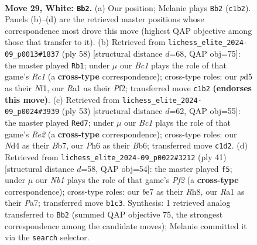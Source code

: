 \documentclass[11pt]{article}
\begin{document}
\clearpage

\begin{figure}[p]\centering
\begin{subfigure}{0.46\textwidth}\centering
\resizebox{\linewidth}{!}{%
\newchessgame
\chessboard[
  setfen={rn1k1r2/1p2bb1p/6pP/p2pPp2/P2N4/6P1/6K1/RNB2R2 w - - 1 29},
  showmover=false,
  pgfstyle=straightmove, color=movearrow, markmove={c1-b2}
]}
\caption{}
\end{subfigure}\hfill
\begin{subfigure}{0.46\textwidth}\centering
\resizebox{\linewidth}{!}{%
\newchessgame
\chessboard[
  setfen={2r1r1k1/1p4b1/p5pp/P3pp2/1nP5/7P/5PPB/2R1RNK1 w - - 0 30},
  showmover=false,
  pgfstyle=straightmove, color=movearrow, markmove={c1-b1}
]}
\caption{}
\end{subfigure}
\\[4pt]
\begin{subfigure}{0.46\textwidth}\centering
\resizebox{\linewidth}{!}{%
\newchessgame
\chessboard[
  setfen={3r2k1/1b2rp2/1b5p/2pP2p1/2B5/6BP/1P3PP1/R2R1K2 b - - 1 27},
  showmover=false,
  pgfstyle=straightmove, color=movearrow, markmove={e7-d7}
]}
\caption{}
\end{subfigure}\hfill
\begin{subfigure}{0.46\textwidth}\centering
\resizebox{\linewidth}{!}{%
\newchessgame
\chessboard[
  setfen={2k3rr/ppp2p2/2nb4/3p4/3P2P1/2P1N3/PP6/R1B1R1K1 b - - 0 21},
  showmover=false,
  pgfstyle=straightmove, color=movearrow, markmove={f7-f5}
]}
\caption{}
\end{subfigure}
\caption{\textbf{Move 29, White: \texttt{Bb2}.} (a) Our position; Melanie plays \texttt{Bb2} (\texttt{c1b2}). Panels (b)--(d) are the retrieved master positions whose correspondence most drove this move (highest QAP objective among those that transfer to it). (b) Retrieved from \texttt{lichess\_elite\_2024-09\_p0013\#1837} (ply 58) [structural distance $d$=68, QAP obj=75]: the master played \texttt{Rb1}; under $\mu$ our \emph{Bc1} plays the role of that game's \emph{Rc1} (a \textbf{cross-type} correspondence); cross-type roles: our \emph{p}d5 as their \emph{N}f1, our \emph{R}a1 as their \emph{P}f2; transferred move \texttt{c1b2} \textbf{(endorses this move)}. (c) Retrieved from \texttt{lichess\_elite\_2024-09\_p0024\#3939} (ply 53) [structural distance $d$=62, QAP obj=55]: the master played \texttt{Red7}; under $\mu$ our \emph{Bc1} plays the role of that game's \emph{Re2} (a \textbf{cross-type} correspondence); cross-type roles: our \emph{N}d4 as their \emph{B}b7, our \emph{P}h6 as their \emph{B}b6; transferred move \texttt{c1d2}. (d) Retrieved from \texttt{lichess\_elite\_2024-09\_p0022\#3212} (ply 41) [structural distance $d$=58, QAP obj=54]: the master played \texttt{f5}; under $\mu$ our \emph{Nb1} plays the role of that game's \emph{Pf2} (a \textbf{cross-type} correspondence); cross-type roles: our \emph{b}e7 as their \emph{R}h8, our \emph{R}a1 as their \emph{P}a7; transferred move \texttt{b1c3}. Synthesis: 1 retrieved analog transferred to \texttt{Bb2} (summed QAP objective 75, the strongest correspondence among the candidate moves); Melanie committed it via the \texttt{search} selector.}
\label{fig:thought-m56}
\end{figure}
\end{document}
